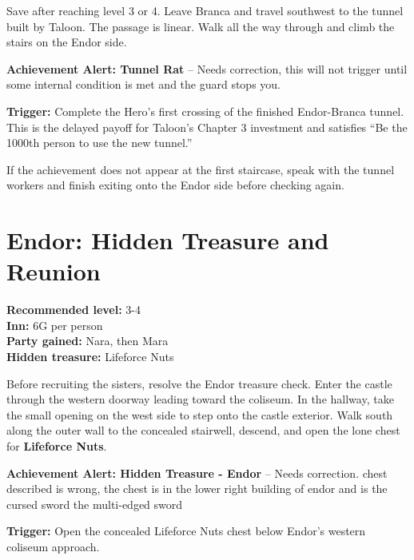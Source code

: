 \documentclass[
  american,
  10pt,
  letterpaper,
  oneside,
  open=any]{scrreprt}
\begin{document}
Save after reaching level 3 or 4. Leave Branca and travel southwest to
the tunnel built by Taloon. The passage is linear. Walk all the way
through and climb the stairs on the Endor side.

\begin{achievementalert}

\textbf{Achievement Alert: Tunnel Rat} -- Needs correction, this will
not trigger until some internal condition is met and the guard stops
you.

\textbf{Trigger:} Complete the Hero's first crossing of the finished
Endor-Branca tunnel. This is the delayed payoff for Taloon's Chapter 3
investment and satisfies ``Be the 1000th person to use the new tunnel.''

\end{achievementalert}

If the achievement does not appear at the first staircase, speak with
the tunnel workers and finish exiting onto the Endor side before
checking again.

\section{Endor: Hidden Treasure and
Reunion}\label{endor-hidden-treasure-and-reunion}

\textbf{Recommended level:} 3-4\\
\textbf{Inn:} 6G per person\\
\textbf{Party gained:} Nara, then Mara\\
\textbf{Hidden treasure:} Lifeforce Nuts

Before recruiting the sisters, resolve the Endor treasure check. Enter
the castle through the western doorway leading toward the coliseum. In
the hallway, take the small opening on the west side to step onto the
castle exterior. Walk south along the outer wall to the concealed
stairwell, descend, and open the lone chest for \textbf{Lifeforce Nuts}.

\begin{achievementalert}

\textbf{Achievement Alert: Hidden Treasure - Endor} -- Needs correction.
chest described is wrong, the chest is in the lower right building of
endor and is the cursed sword the multi-edged sword

\textbf{Trigger:} Open the concealed Lifeforce Nuts chest below Endor's
western coliseum approach.

\end{achievementalert}
\end{document}
